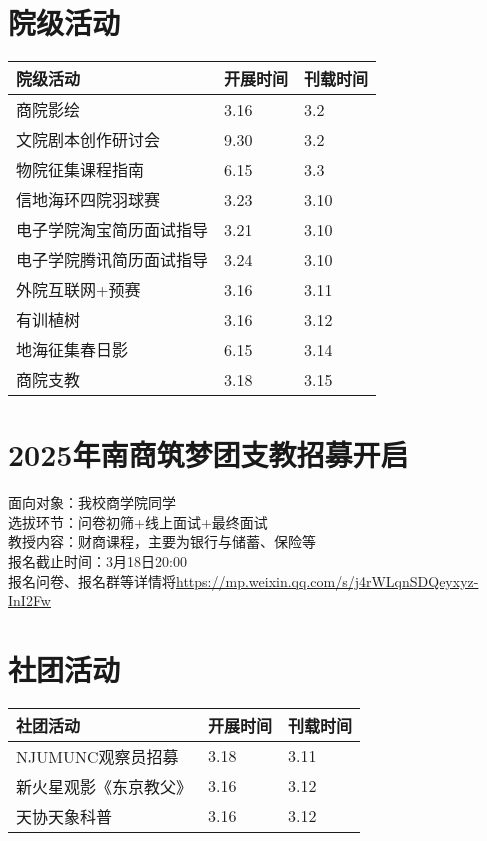 \documentclass[letterpaper, 12pt]{article}
\begin{document}
\begin{multicols}{2}
\section{院级活动}
\begin{tabular}{|>{\centering\arraybackslash}m{}|m{}|m{}|}
    \hline
    院级活动 & 开展时间 & 刊载时间\\
    \hline\hline
    商院影绘 & 3.16 & 3.2\\
    文院剧本创作研讨会 & 9.30 & 3.2\\
    物院征集课程指南 & 6.15 & 3.3\\
    信地海环四院羽球赛 & 3.23 & 3.10\\
    电子学院淘宝简历面试指导 & 3.21 & 3.10\\
    电子学院腾讯简历面试指导 & 3.24 & 3.10\\
    外院互联网+预赛 & 3.16 & 3.11\\
    有训植树 & 3.16 & 3.12\\
    地海征集春日影 & 6.15 & 3.14\\
    商院支教 & 3.18 & 3.15\\
    \hline
\end{tabular}
\section{2025年南商筑梦团支教招募开启}
面向对象：我校商学院同学\\
选拔环节：问卷初筛+线上面试+最终面试\\
教授内容：财商课程，主要为银行与储蓄、保险等\\
报名截止时间：3月18日20:00\\
报名问卷、报名群等详情将\url{https://mp.weixin.qq.com/s/j4rWLqnSDQeyxyz-InI2Fw}\\
\section{社团活动}
\begin{tabular}{|>{\centering\arraybackslash}m{}|m{}|m{}|}
    \hline
    社团活动 & 开展时间 & 刊载时间\\
    \hline\hline
    NJUMUNC观察员招募 & 3.18 & 3.11\\
    新火星观影《东京教父》 & 3.16 & 3.12\\
    天协天象科普 & 3.16 & 3.12\\
    \hline
\end{tabular}

\end{multicols}
\end{document}

